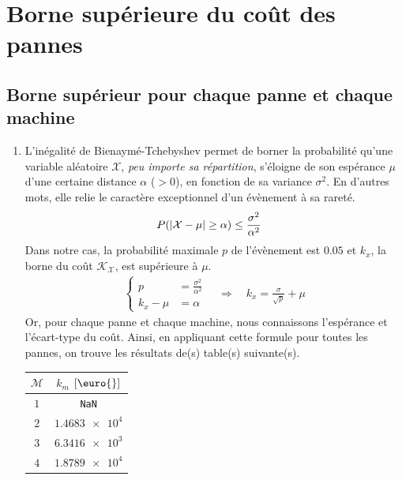 \documentclass[a4paper, 12pt]{article}
\newcommand{\X}{\mathcal{X}}
\newcommand{\M}{\mathcal{M}}
\begin{document}
\section{Borne supérieure du coût des pannes}
\subsection{Borne supérieur pour chaque panne et chaque machine}
\begin{enumerate}[label=\roman*.]
	\item L'inégalité de Bienaymé-Tchebyshev permet de borner la probabilité qu'une variable aléatoire $\X$, \textit{peu importe sa répartition}, s'éloigne de son espérance $\mu$ d'une certaine distance $\alpha$ ($> 0$), en fonction de sa variance $\sigma^2$. En d'autres mots, elle relie le caractère exceptionnel d'un évènement à sa rareté.
	\begin{align}
		P(\left|\X - \mu\right| \geq \alpha) & \leq \frac{\sigma^2}{\alpha^2} {\label{eq:bienayme-tchebyshev}}
	\end{align}
	Dans notre cas, la probabilité maximale $p$ de l'évènement est $\num{0.05}$ et $k_x$, la borne du coût $\mathcal{K}_{\X}$, est supérieure à $\mu$.
	\begin{align*}
		\left\{\begin{aligned}
			p         & = \frac{\sigma^2}{\alpha^2} \\
			k_x - \mu & = \alpha
		\end{aligned}\right.
		\quad \Rightarrow \quad k_x = \frac{\sigma}{\sqrt{p}} + \mu
	\end{align*}
	Or, pour chaque panne et chaque machine, nous connaissons l'espérance et l'écart-type du coût. Ainsi, en appliquant cette formule pour toutes les pannes, on trouve les résultats de(s) table(s) suivante(s).
	\begin{table}[H]
		\centering
		\begin{tabular}{|c|c|}
			\hline
			$\M$ & $k_m$ $\left[\textrm{\euro{}}\right]$ \\ \hline
			$1$  &             \texttt{NaN}              \\ \hline
			$2$  &           $\num{1.4683e4}$            \\ \hline
			$3$  &           $\num{6.3416e3}$            \\ \hline
			$4$  &           $\num{1.8789e4}$            \\ \hline
		\end{tabular}
		\hspace{2\mytextsize}

\end{table}
\end{enumerate}
\end{document}
